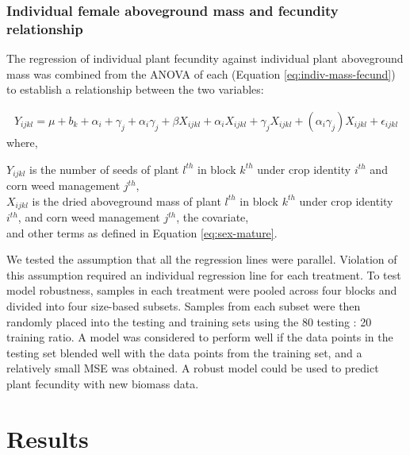 \documentclass[
]{article}
\begin{document}
\hypertarget{individual-female-aboveground-mass-and-fecundity-relationship}{%
\subsubsection*{Individual female aboveground mass and fecundity relationship}\label{individual-female-aboveground-mass-and-fecundity-relationship}}

The regression of individual plant fecundity against individual plant aboveground mass was combined from the ANOVA of each (Equation \eqref{eq:indiv-mass-fecund}) to establish a relationship between the two variables:

\begin{align} 
Y_{ijkl} = \mu + b_k + \alpha_i + \gamma_j +\alpha_i \gamma_j + \beta X_{ijkl} + \alpha_i X_{ijkl} + \gamma_j X_{ijkl} + (\alpha_i \gamma_j)X_{ijkl} + \epsilon_{ijkl} \label{eq:mass-fecund-anc}
\end{align}
where,

\(Y_{ijkl}\) is the number of seeds of plant \(l^{th}\) in block \(k^{th}\) under crop identity \(i^{th}\) and corn weed management \(j^{th}\),\\
\(X_{ijkl}\) is the dried aboveground mass of plant \(l^{th}\) in block \(k^{th}\) under crop identity \(i^{th}\), and corn weed management \(j^{th}\), the covariate,\\
and other terms as defined in Equation \eqref{eq:sex-mature}.

We tested the assumption that all the regression lines were parallel. Violation of this assumption required an individual regression line for each treatment.
To test model robustness, samples in each treatment were pooled across four blocks and divided into four size-based subsets. Samples from each subset were then randomly placed into the testing and training sets using the 80 testing : 20 training ratio. A model was considered to perform well if the data points in the testing set blended well with the data points from the training set, and a relatively small MSE was obtained. A robust model could be used to predict plant fecundity with new biomass data.

\hypertarget{results}{%
\section*{Results}\label{results}}
\end{document}
